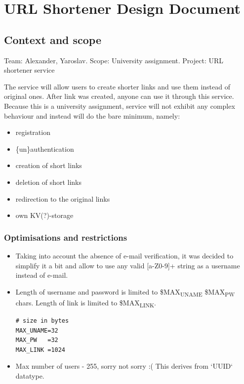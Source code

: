 \documentclass[11pt]{article}
\date{\today}
\title{}
\begin{document}
\tableofcontents

\section{URL Shortener Design Document}
\label{sec:org6f8958a}

\subsection{Context and scope}
\label{sec:org80bc7fb}
Team:    Alexander, Yaroslav.
Scope:   University assignment.
Project: URL shortener service

The service will allow users to create shorter links and use them instead
of original ones. After link was created, anyone can use it through
this service.
Because this is a university assignment, service will not exhibit any
complex behaviour and instead will do the bare minimum, namely:
\begin{itemize}
\item registration
\item \{un\}authentication
\item creation of short links
\item deletion of short links
\item redirection to the original links
\item own KV(?)-storage
\end{itemize}

\subsubsection{Optimisations and restrictions}
\label{sec:org2c3bb16}
\begin{itemize}
\item Taking into account the absence of e-mail verification, it was decided
to simplify it a bit and allow to use any valid [a-Z0-9]+ string as
a username instead of e-mail.

\item Length of username and password is limited to \$MAX\textsubscript{UNAME}
\$MAX\textsubscript{PW} chars. Length of link is limited to \$MAX\textsubscript{LINK}.
\begin{verbatim}
# size in bytes
MAX_UNAME=32
MAX_PW   =32
MAX_LINK =1024
\end{verbatim}

\item Max number of users - 255, sorry not sorry :(
This derives from `UUID` datatype.
\end{itemize}
\end{document}
